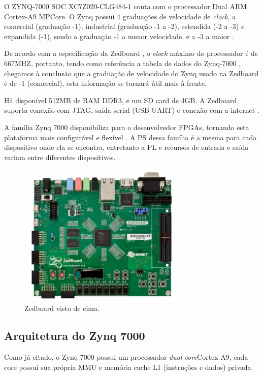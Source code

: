 \documentclass{ufscThesis/ufscThesis} %
\begin{document}
O ZYNQ-7000 SOC XC7Z020-CLG484-1 conta com o processador Dual ARM Cortex-A9 MPCore. O Zynq possui 4 graduações de velocidade de \emph{clock}, a comercial (graduação -1), industrial (graduação -1 a -2), estendida (-2 a -3) e expandida (-1), sendo a graduação -1 a menor velocidade, e a -3 a maior \cite{product_table}.

De acordo com a especificação da Zedboard \cite{zedboard}, o \emph{clock} máximo do processador é de 667MHZ, portanto, tendo como referência a tabela de dados do Zynq-7000 \cite[p.~13]{data_sheet}, chegamos à conclusão que a graduação de velocidade do Zynq usado na Zedboard é de -1 (comercial), esta informação se tornará útil mais à frente.

Há disponível 512MB de RAM DDR3, e um SD card de 4GB. A Zedboard suporta conexão com JTAG, saída serial (USB UART) e conexão com a internet \cite{xilinx}.

A família Zynq 7000 disponibiliza para o desenvolvedor FPGAs, tornando esta plataforma mais configurável e flexível \cite[p.~26]{ug585}. A PS dessa família é a mesma para cada dispositivo onde ela se encontra, entretanto a PL e recursos de entrada e saída variam entre diferentes dispositivos. 


\begin{figure}[ht!]
    \centering
    \includegraphics[width=8cm]{figuras/zedboard}
    \caption{Zedboard visto de cima.}
\end{figure}

\subsection{Arquitetura do Zynq 7000}
Como já citado, o Zynq 7000 possui um processador \emph{dual core}Cortex A9, cada core possui sua própria MMU e memória cache L1 (instruções e dados) privada.

\end{document}
